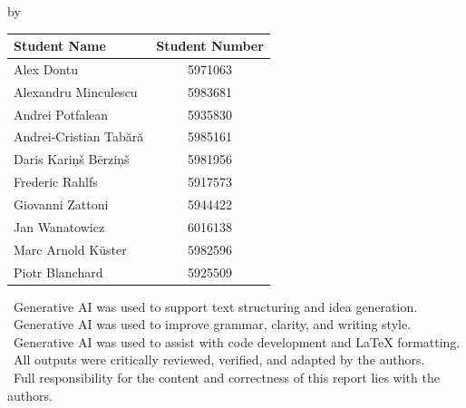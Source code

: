 \begin{titlepage}

\begin{center}

{\makeatletter
\largetitlestyle\fontsize{45}{45}\selectfont\@title
\makeatother}

{\makeatletter
\ifdefvoid{\@subtitle}{}{\bigskip\titlestyle\fontsize{20}{20}\selectfont\@subtitle}
\makeatother}

\bigskip
\bigskip

by

\bigskip
\bigskip

{\makeatletter
\largetitlestyle\fontsize{25}{25}\selectfont\@author
\makeatother}

\bigskip
\bigskip

\setlength\extrarowheight{2pt}
\begin{tabular}{lc}
    Student Name & Student Number \\\midrule
    Alex Dontu & 5971063\\
    Alexandru Minculescu & 5983681\\
    Andrei Potfalean & 5935830\\
    Andrei-Cristian Tabără & 5985161\\
    Daris Kariņš Bērziņš & 5981956\\
    Frederic Rahlfs & 5917573\\
    Giovanni Zattoni & 5944422\\
    Jan Wanatowicz & 6016138\\
    Marc Arnold Küster & 5982596\\
    Piotr Blanchard & 5925509\\    
\end{tabular}


\vspace{4.5em}


\begin{center}
\begin{minipage}{0.7\textwidth}
\centering
\textbullet\ Generative AI was used to support text structuring and idea generation. \\[0.3em]
\textbullet\ Generative AI was used to improve grammar, clarity, and writing style. \\[0.3em]
\textbullet\ Generative AI was used to assist with code development and LaTeX formatting. \\[0.3em]
\textbullet\ All outputs were critically reviewed, verified, and adapted by the authors. \\[0.3em]
\textbullet\ Full responsibility for the content and correctness of this report lies with the authors.
\end{minipage}
\end{center}





\end{center}
\end{titlepage}
